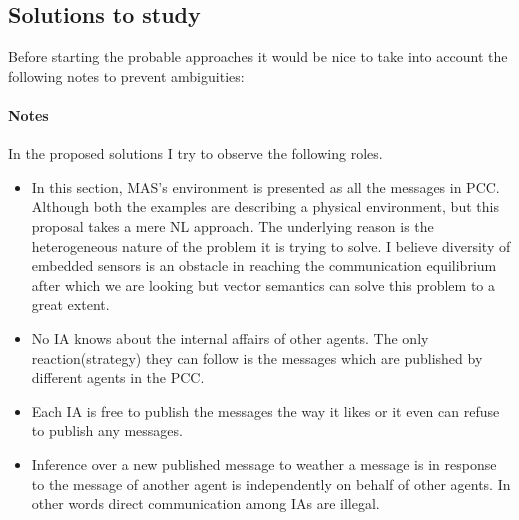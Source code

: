 \documentclass{article}
\begin{document}
\begin{multicols}{2}
		\subsection{Solutions to study}
			Before starting the probable approaches it would be nice to take into account the following notes to prevent ambiguities:
			\paragraph{Notes}
				In the proposed solutions I try to observe the following roles.  
				\begin{itemize}
					\item In this section, MAS's environment is presented as all the messages in PCC. Although both the examples are describing a physical environment, but this proposal takes a mere NL approach. The underlying reason is the heterogeneous nature of the problem it is trying to solve. I believe diversity of embedded sensors is an obstacle in reaching the communication equilibrium after which we are looking but vector semantics can solve this problem to a great extent.    
					
					\item No IA knows about the internal affairs of other agents. The only reaction(strategy) they can follow is the messages which are published by different agents in the PCC.
					
					\item Each IA is free to publish the messages the way it likes or it even can refuse to publish any messages. 
					
					\item Inference over a new published message to weather a message is in response to the message of another agent is independently on behalf of other agents. In other words direct communication among IAs are illegal.
				\end{itemize}
			

\end{multicols}
\end{document}
